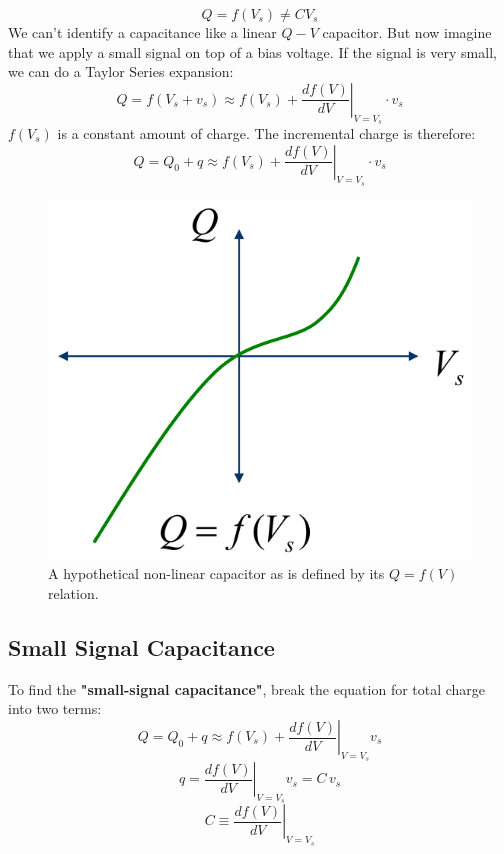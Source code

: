     \begin{equation} 
        Q = f({V_s}) \ne C{V_s} 
    \end{equation}
We can’t identify a capacitance like a linear $Q-V$ capacitor.  But now imagine that we apply a small signal on top of a bias voltage.  If the signal is very small, we can do a Taylor Series expansion:
    \begin{equation} 
        Q = f({V_s} + {v_s}) \approx f({V_s}) + {\left. {\frac{{df(V)}}{{dV}}} \right|_{V = {V_s}}} \cdot {v_s} 
    \end{equation}
$f(V_s)$ is a constant amount of charge.  The incremental charge is therefore:
    \begin{equation} 
        Q = {Q_0} + q \approx f({V_s}) + {\left. {\frac{{df(V)}}{{dV}}} \right|_{V = {V_s}}} \cdot {v_s}
    \end{equation}
\begin{figure}[tb]
\centering
\includegraphics[width=.35\columnwidth]{mod2-2_ICtech_sld_20} 
\caption{A hypothetical non-linear capacitor as is defined by its $Q = f(V)$ relation.} \label{fig:mod2-2_ICtech_sld_20}
\end{figure}
\subsection{Small Signal Capacitance}
To find the \textbf{"small-signal capacitance"}, break the equation for total charge into two terms:
    \begin{equation} 
        Q = {Q_0} + q \approx f({V_s}) + {\left. {\frac{{df(V)}}{{dV}}} \right|_{V = {V_s}}}{v_s} 
    \end{equation}
    \begin{equation} 
        q = {\left. {\frac{{df(V)}}{{dV}}} \right|_{V = {V_s}}}{v_s} = C\,{v_s} 
    \end{equation}
    \begin{equation} 
        C \equiv {\left. {\frac{{df(V)}}{{dV}}} \right|_{V = {V_s}}} 
    \end{equation}
